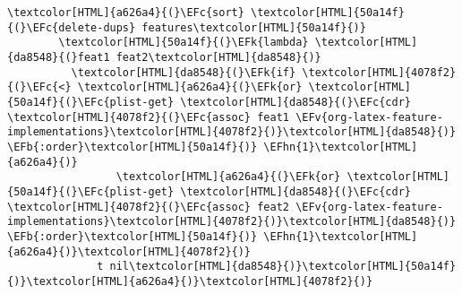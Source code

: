 \documentclass{scrartcl}
\newcommand{\EFk}[1]{\textcolor{EFk}{#1}} %
\newcommand{\EFb}[1]{\textcolor{EFb}{#1}} %
\newcommand{\EFc}[1]{\textcolor{EFc}{#1}} %
\newcommand{\EFv}[1]{\textcolor{EFv}{#1}} %
\newcommand{\EFhn}[1]{\textcolor{EFhn}{\textbf{#1}}} %
\begin{document}
\begin{enumerate}
\begin{Code}
\begin{Verbatim}[]
  \textcolor[HTML]{a626a4}{(}\EFc{sort} \textcolor[HTML]{50a14f}{(}\EFc{delete-dups} features\textcolor[HTML]{50a14f}{)}
        \textcolor[HTML]{50a14f}{(}\EFk{lambda} \textcolor[HTML]{da8548}{(}feat1 feat2\textcolor[HTML]{da8548}{)}
          \textcolor[HTML]{da8548}{(}\EFk{if} \textcolor[HTML]{4078f2}{(}\EFc{<} \textcolor[HTML]{a626a4}{(}\EFk{or} \textcolor[HTML]{50a14f}{(}\EFc{plist-get} \textcolor[HTML]{da8548}{(}\EFc{cdr} \textcolor[HTML]{4078f2}{(}\EFc{assoc} feat1 \EFv{org-latex-feature-implementations}\textcolor[HTML]{4078f2}{)}\textcolor[HTML]{da8548}{)} \EFb{:order}\textcolor[HTML]{50a14f}{)} \EFhn{1}\textcolor[HTML]{a626a4}{)}
                 \textcolor[HTML]{a626a4}{(}\EFk{or} \textcolor[HTML]{50a14f}{(}\EFc{plist-get} \textcolor[HTML]{da8548}{(}\EFc{cdr} \textcolor[HTML]{4078f2}{(}\EFc{assoc} feat2 \EFv{org-latex-feature-implementations}\textcolor[HTML]{4078f2}{)}\textcolor[HTML]{da8548}{)} \EFb{:order}\textcolor[HTML]{50a14f}{)} \EFhn{1}\textcolor[HTML]{a626a4}{)}\textcolor[HTML]{4078f2}{)}
              t nil\textcolor[HTML]{da8548}{)}\textcolor[HTML]{50a14f}{)}\textcolor[HTML]{a626a4}{)}\textcolor[HTML]{4078f2}{)}
\end{Verbatim}
\end{Code}


\end{enumerate}
\end{document}
